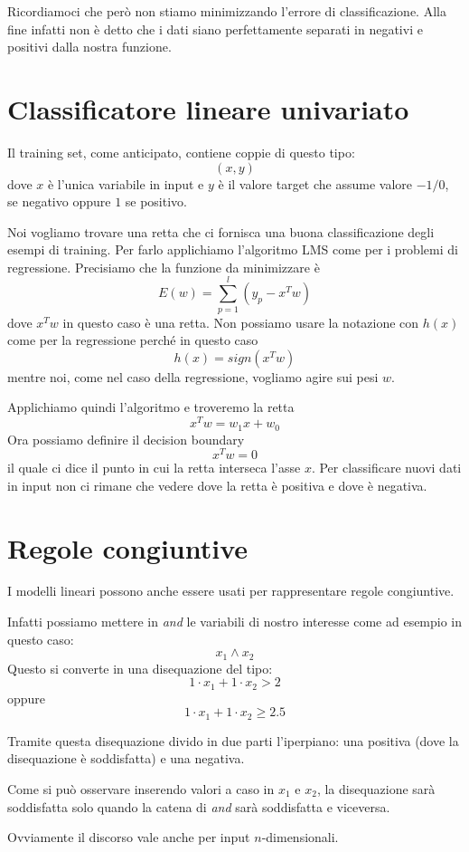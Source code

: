 Ricordiamoci che per\`o non stiamo minimizzando l'errore di classificazione. Alla fine infatti non \`e detto che i dati
siano perfettamente separati in negativi e positivi dalla nostra funzione.

\section{Classificatore lineare univariato}
Il training set, come anticipato, contiene coppie di questo tipo:
\[ (x, y) \]
dove $x$ \`e l'unica variabile in input e $y$ \`e il valore target che assume valore $-1/0$, se negativo oppure $1$ se
positivo.

Noi vogliamo trovare una retta che ci fornisca una buona classificazione degli esempi di training. Per farlo applichiamo
l'algoritmo LMS come per i problemi di regressione. Precisiamo che la funzione da minimizzare \`e
\[ E(w) = \sum_{p = 1}^l (y_p - x^T w) \]
dove $x^T w$ in questo caso \`e una retta. Non possiamo usare la notazione con $h(x)$ come per la regressione perch\'e
in questo caso
\[ h(x) = sign(x^T w) \]
mentre noi, come nel caso della regressione, vogliamo agire sui pesi $w$.

Applichiamo quindi l'algoritmo e troveremo la retta
\[ x^T w = w_1 x + w_0 \]
Ora possiamo definire il decision boundary
\[ x^T w = 0 \]
il quale ci dice il punto in cui la retta interseca l'asse $x$. Per classificare nuovi dati in input non ci rimane che
vedere dove la retta \`e positiva e dove \`e negativa.

\section{Regole congiuntive}
I modelli lineari possono anche essere usati per rappresentare regole congiuntive.

Infatti possiamo mettere in \emph{and} le variabili di nostro interesse come ad esempio in questo caso:
\[ x_1 \wedge x_2 \]
Questo si converte in una disequazione del tipo:
\[ 1 \cdot x_1 + 1 \cdot x_2 > 2 \]
oppure
\[ 1 \cdot x_1 + 1 \cdot x_2 \geq 2.5 \]

Tramite questa disequazione divido in due parti l'iperpiano: una positiva (dove la disequazione \`e soddisfatta) e una
negativa.

Come si pu\`o osservare inserendo valori a caso in $x_1$ e $x_2$, la disequazione sar\`a soddisfatta solo quando la
catena di \emph{and} sar\`a soddisfatta e viceversa.

Ovviamente il discorso vale anche per input $n$-dimensionali.

